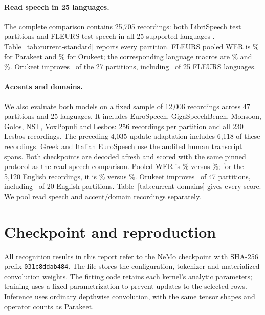 \documentclass{article}
\begin{document}
\paragraph{Read speech in 25 languages.}
The complete comparison contains 25,705 recordings: both LibriSpeech test
partitions \citep{librispeech} and FLEURS test speech in all 25 supported
languages \citep{fleurs}. Table~\ref{tab:current-standard} reports every partition.
FLEURS pooled WER is \FleursPooledParakeetWER\% for Parakeet and
\FleursPooledOrukeetWER\% for Orukeet; the corresponding language macros are
\FleursMacroParakeetWER\% and \FleursMacroOrukeetWER\%.
Orukeet improves \StandardWins\ of the 27 partitions, including
\FleursWins\ of 25 FLEURS languages.



\paragraph{Accents and domains.}
We also evaluate both models on a fixed sample of 12,006 recordings across
47 partitions and 25 languages. It includes EuroSpeech, GigaSpeechBench,
Monsoon, Golos, NST, VoxPopuli and Lesbos: 256 recordings per partition and all
230 Lesbos recordings. The preceding 4,035-update adaptation includes 6,118
of these recordings. Greek and Italian EuroSpeech use the
audited human transcript spans. Both checkpoints are decoded afresh and scored
with the same pinned protocol as the read-speech comparison.
Pooled WER is \DomainPooledParakeetWER\% versus \DomainPooledOrukeetWER\%;
for the 5,120 English recordings, it is \DomainEnglishParakeetWER\% versus
\DomainEnglishOrukeetWER\%. Orukeet improves \DomainWins\ of 47 partitions,
including \DomainEnglishWins\ of 20 English partitions. Table~\ref{tab:current-domains}
gives every score. We pool read speech and accent/domain recordings separately.

\section{Checkpoint and reproduction}
All recognition results in this report refer to the NeMo checkpoint with
SHA-256 prefix \texttt{031c8ddab484}. The file stores the configuration,
tokenizer and materialized convolution weights. The fitting code retains each
kernel's analytic parameters; training uses a fixed parametrization to prevent
updates to the selected rows. Inference uses ordinary depthwise convolution,
with the same tensor shapes and operator counts as Parakeet.
\end{document}
